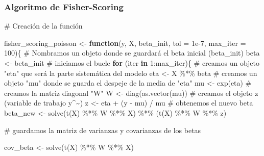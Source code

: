 \documentclass[
  letterpaper,
  DIV=11,
  numbers=noendperiod]{scrartcl}
\newenvironment{Shaded}{\begin{snugshade}}{\end{snugshade}}
\newcommand{\AttributeTok}[1]{\textcolor[rgb]{0.40,0.45,0.13}{#1}}
\newcommand{\CommentTok}[1]{\textcolor[rgb]{0.37,0.37,0.37}{#1}}
\newcommand{\ControlFlowTok}[1]{\textcolor[rgb]{0.00,0.23,0.31}{\textbf{#1}}}
\newcommand{\DecValTok}[1]{\textcolor[rgb]{0.68,0.00,0.00}{#1}}
\newcommand{\FloatTok}[1]{\textcolor[rgb]{0.68,0.00,0.00}{#1}}
\newcommand{\FunctionTok}[1]{\textcolor[rgb]{0.28,0.35,0.67}{#1}}
\newcommand{\NormalTok}[1]{\textcolor[rgb]{0.00,0.23,0.31}{#1}}
\newcommand{\OtherTok}[1]{\textcolor[rgb]{0.00,0.23,0.31}{#1}}
\newcommand{\SpecialCharTok}[1]{\textcolor[rgb]{0.37,0.37,0.37}{#1}}
\begin{document}
\subsubsection{Algoritmo de
Fisher-Scoring}\label{algoritmo-de-fisher-scoring}

\begin{Shaded}
\begin{Highlighting}[]
\CommentTok{\# Creación de la función}

\NormalTok{fisher\_scoring\_poisson }\OtherTok{\textless{}{-}} \ControlFlowTok{function}\NormalTok{(y, X, beta\_init, }\AttributeTok{tol =} \FloatTok{1e{-}7}\NormalTok{, }\AttributeTok{max\_iter =} \DecValTok{100}\NormalTok{)\{}
  \CommentTok{\# Nombramos un objeto donde se guardará el beta inicial (beta\_init)}
\NormalTok{  beta }\OtherTok{\textless{}{-}}\NormalTok{ beta\_init}
  \CommentTok{\# iniciamos el bucle }
  \ControlFlowTok{for}\NormalTok{ (iter }\ControlFlowTok{in} \DecValTok{1}\SpecialCharTok{:}\NormalTok{max\_iter)\{}
    \CommentTok{\# creamos un objeto "eta" que será la parte sistemática del modelo}
\NormalTok{    eta }\OtherTok{\textless{}{-}}\NormalTok{ X }\SpecialCharTok{\%*\%}\NormalTok{ beta}
    \CommentTok{\# creamos un objeto "mu" donde se guarda el despeje de la media de "eta"}
\NormalTok{    mu }\OtherTok{\textless{}{-}} \FunctionTok{exp}\NormalTok{(eta)}
    \CommentTok{\# creamos la matriz diagonal "W"}
\NormalTok{    W }\OtherTok{\textless{}{-}} \FunctionTok{diag}\NormalTok{(}\FunctionTok{as.vector}\NormalTok{(mu))}
    \CommentTok{\# creamos el objeto z (variable de trabajo y\^{}\textasciitilde{})}
\NormalTok{    z }\OtherTok{\textless{}{-}}\NormalTok{ eta }\SpecialCharTok{+}\NormalTok{ (y }\SpecialCharTok{{-}}\NormalTok{ mu) }\SpecialCharTok{/}\NormalTok{ mu}
    \CommentTok{\# obtenemos el nuevo beta}
\NormalTok{    beta\_new }\OtherTok{\textless{}{-}} \FunctionTok{solve}\NormalTok{(}\FunctionTok{t}\NormalTok{(X) }\SpecialCharTok{\%*\%}\NormalTok{ W }\SpecialCharTok{\%*\%}\NormalTok{ X) }\SpecialCharTok{\%*\%}\NormalTok{ (}\FunctionTok{t}\NormalTok{(X) }\SpecialCharTok{\%*\%}\NormalTok{ W }\SpecialCharTok{\%*\%}\NormalTok{ z)}
    
    \CommentTok{\# guardamos la matriz de varianzas y covarianzas de los betas}
    
\NormalTok{    cov\_beta }\OtherTok{\textless{}{-}} \FunctionTok{solve}\NormalTok{(}\FunctionTok{t}\NormalTok{(X) }\SpecialCharTok{\%*\%}\NormalTok{ W }\SpecialCharTok{\%*\%}\NormalTok{ X)}
    

\end{Highlighting}
\end{Shaded}
\end{document}
